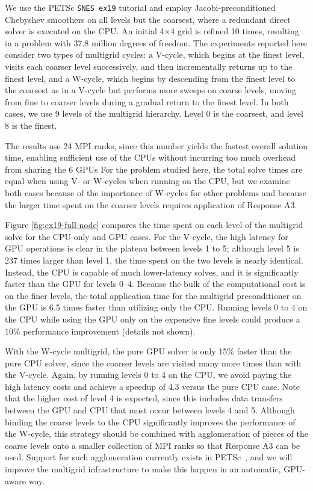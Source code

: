 \documentclass[5p,times]{elsarticle}
\begin{document}
We use the PETSc {\tt SNES ex19} tutorial and employ
Jacobi-preconditioned Chebyshev smoothers on all levels but the coarsest,
where a redundant direct solver is executed on the CPU.
An initial 4$\times$4 grid is refined 10 times, resulting in a problem with 37.8 million 
degrees of freedom.
The experiments reported here consider two types of multigrid cycles:
a V-cycle, which begins at the finest level, visits each coarser level
successively, and then incrementally returns up to the finest level, and a
W-cycle, which begins by descending from the finest level to the coarsest as in a V-cycle but
performs more sweeps on coarse levels, moving from fine to coarser
levels during a gradual return to the finest level. In both cases, we use 9 levels of the multigrid hierarchy. 
Level 0 is the coarsest, and level 8 is the finest.

The results use 24 MPI ranks, since this number yields the fastest overall solution time,
enabling sufficient use of the CPUs without incurring too much overhead
from sharing the 6 GPUs %
For the problem studied here, the total solve times are equal when using V- or
W-cycles when running on the CPU, but we examine both cases because of the
importance of W-cycles for other problems and because the larger 
time spent on the coarser levels requires application of Response A3.

Figure \ref{fig:ex19-full-node} compares the time spent on each level of the
multigrid solve for the CPU-only and GPU cases. 
For the V-cycle, the high latency for GPU operations is clear in
the plateau between levels 1 to 5;
although level 5 is 237 times larger than level 1, the time spent
on the two levels is nearly identical.
Instead, the CPU is capable of much lower-latency solves, and it is
significantly faster than the GPU for levels 0--4.
Because the bulk of the computational cost is on the finer levels,
the total application time for the multigrid preconditioner on the GPU 
is 6.5 times faster than utilizing only the CPU.
Running levels
0 to 4 on the CPU while using the GPU only
on the expensive fine levels could produce a 10\% performance improvement (details not shown).

With the W-cycle multigrid, the pure GPU solver is only 15\% faster than the pure CPU solver,
since the coarser levels are visited many more times than with the V-cycle.
Again, by running levels 0 to 4 on the CPU, we avoid paying the high latency costs
and achieve a speedup of 4.3 versus the pure CPU case.
Note that the higher cost of level 4 is expected, since this includes
data transfers between the GPU and CPU that must occur between levels 4 and 5.
Although binding the coarse levels to the CPU significantly improves the performance of
the W-cycle, this strategy should be combined with agglomeration of pieces of the
coarse levels onto a smaller collection of MPI ranks so that Response A3 can be used.
Support for such agglomeration currently exists in PETSc~\cite{PCTELESCOPE}, and we will improve the
multigrid infrastructure to make this happen in an automatic, GPU-aware way.
\end{document}
